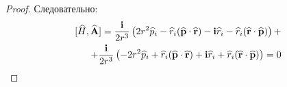 \begin{proof}
Следовательно:
$$
\begin{aligned}
{[\widehat{H},\widehat{\mathbf{A}}]} = 
\frac{\mathbf{i}}{2 r^3} \left ( { 2 r^2 \widehat{p}_i - \widehat{r}_i (\widehat{\mathbf{p}} \cdot \widehat{\mathbf{r}}) - \mathbf{i} \widehat{r}_i - \widehat{r}_i (\widehat{\mathbf{r}} \cdot \widehat{\mathbf{p}}) } \right ) + \\
+ \frac{\mathbf{i}}{2 r^3} \left ( { -2 r^2 \widehat{p}_i + \widehat{r}_i (\widehat{\mathbf{p}} \cdot \widehat{\mathbf{r}}) + \mathbf{i} \widehat{r}_i + \widehat{r}_i (\widehat{\mathbf{r}} \cdot \widehat{\mathbf{p}}) } \right ) = 0
\end{aligned}
$$


\end{proof}
